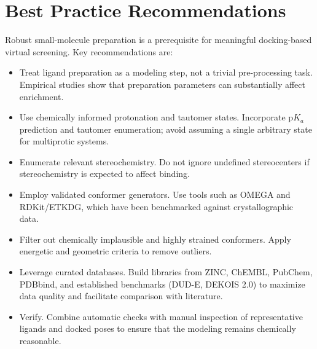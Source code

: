 \documentclass[12pt, a4paper]{article}
\begin{document}
\section{Best Practice Recommendations}

Robust small-molecule preparation is a prerequisite for meaningful docking-based virtual screening. Key recommendations are:

\begin{itemize}
  \item Treat ligand preparation as a modeling step, not a trivial pre-processing task. Empirical studies show that preparation parameters can substantially affect enrichment. 
  \item Use chemically informed protonation and tautomer states. Incorporate p$K_a$ prediction and tautomer enumeration; avoid assuming a single arbitrary state for multiprotic systems.
  \item Enumerate relevant stereochemistry. Do not ignore undefined stereocenters if stereochemistry is expected to affect binding.
  \item Employ validated conformer generators. Use tools such as OMEGA and RDKit/ETKDG, which have been benchmarked against crystallographic data.
  \item Filter out chemically implausible and highly strained conformers. Apply energetic and geometric criteria to remove outliers.
  \item Leverage curated databases. Build libraries from ZINC, ChEMBL, PubChem, PDBbind, and established benchmarks (DUD-E, DEKOIS 2.0) to maximize data quality and facilitate comparison with literature.
  \item Verify. Combine automatic checks with manual inspection of representative ligands and docked poses to ensure that the modeling remains chemically reasonable.
\end{itemize}


\end{document}

